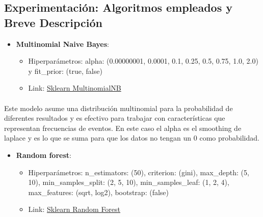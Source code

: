 \documentclass{report}
\begin{document}
{{            \subsection{Experimentación: Algoritmos empleados y Breve Descripción}
                \begin{itemize}
                    \item \textbf{Multinomial Naive Bayes}:
                    \begin{itemize}
                        \item Hiperparámetros: alpha: (0.00000001, 0.0001, 0.1, 0.25, 0.5, 0.75, 1.0, 2.0) y fit\_prior: (true, false)
                        \item Link: \href{https://scikit-learn.org/stable/modules/generated/sklearn.naive_bayes.MultinomialNB.html}{Sklearn MultinomialNB}
                    \end{itemize}
                \end{itemize}
                \paragraph*{}{
                Este modelo asume una distribución multinomial para la probabilidad de diferentes resultados y es efectivo para trabajar con características que representan frecuencias de eventos. En este caso el alpha es el smoothing de laplace y es lo que se suma para que los datos no tengan un 0 como probabilidad.
                }
                \begin{itemize}
                    \item \textbf{Random forest}:
                    \begin{itemize}
                         \item {Hiperparámetros: n\_estimators: (50), criterion: (gini), max\_depth: (5, 10), min\_samples\_split: (2, 5, 10), min\_samples\_leaf: (1, 2, 4), max\_features: (sqrt, log2), bootstrap: (false) }
                        \item Link: \href{https://scikit-learn.org/stable/modules/generated/sklearn.ensemble.RandomForestClassifier.html}{Sklearn Random Forest}
                    \end{itemize}
                \end{itemize}
}}
\end{document}
